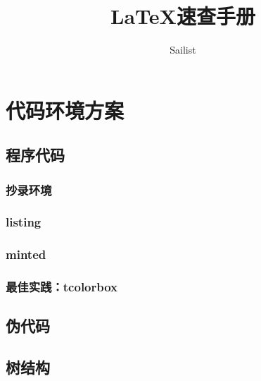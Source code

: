 \documentclass{article}
\title{\LaTeX{}速查手册}
\author{Sailist}
\begin{document}
    
    \maketitle
    \clearpage
    \renewcommand{\baselinestretch}{0.75}\normalsize
    \tableofcontents
    \listoffigures
    \listoftables
    \newpage
    \renewcommand{\baselinestretch}{1.3}\normalsize
    
    

    \section{代码环境方案}
    \subsection{程序代码}
    \subsubsection{抄录环境}
    \subsubsection{listing}
    \subsubsection{minted}
    \subsubsection{最佳实践：tcolorbox}
    \subsection{伪代码}
    
    \subsection{树结构}
\end{document}
